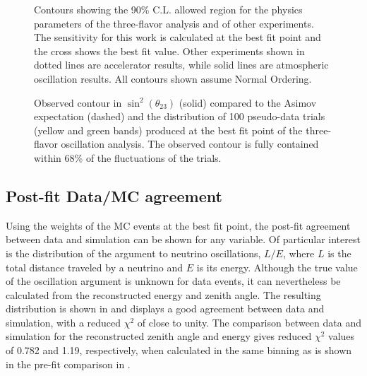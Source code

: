 \begin{figure}
    \centering
  
  \caption{Contours showing the 90\% C.L.
allowed region for the physics parameters of the three-flavor analysis and of other experiments\cite{SK2020,t2k_neutrino_2020,MINOS:2020llm,NOvA:2021nfi}.
The sensitivity for this work is calculated at the best fit point and the cross shows the best fit value.
Other experiments shown in dotted lines are accelerator results, while solid lines are atmospheric oscillation results.
All contours shown assume Normal Ordering.
  \label{fig:real_data_contour_three_flavor}}
\end{figure}

\begin{figure}
    \centering
    
    \caption{Observed contour in $\sin^2(\theta_{23})$ (solid) compared to the Asimov expectation (dashed) and the distribution of 100 pseudo-data trials (yellow and green bands) produced at the best fit point of the three-flavor oscillation analysis.
The observed contour is fully contained within 68\% of the fluctuations of the trials.
  \label{fig:mixing_brazil_band_three_flavor}}
\end{figure}

\subsection{Post-fit Data/MC agreement}

Using the weights of the MC events at the best fit point, the post-fit agreement between data and simulation can be shown for any variable.
Of particular interest is the distribution of the argument to neutrino oscillations, $L/E$, where $L$ is the total distance traveled by a neutrino and $E$ is its energy.
Although the true value of the oscillation argument is unknown for data events, it can nevertheless be calculated from the reconstructed energy and zenith angle.
The resulting distribution is shown in  and displays a good agreement between data and simulation, with a reduced $\chi^2$ of close to unity.
The comparison between data and simulation for the reconstructed zenith angle and energy gives reduced $\chi^2$ values of 0.782 and 1.19, respectively, when calculated in the same binning as is shown in the pre-fit comparison in .

